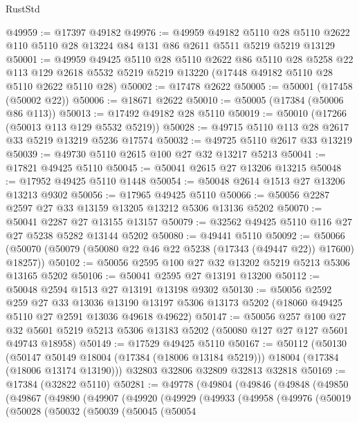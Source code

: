 \begin{lexlean}{RustStd}
\begin{coremodule}
@49959 := @17397 @49182
@49976 := @49959
    @49182
    @5110
    @28
    @5110
    @2622
    @110
    @5110
    @28
    @13224
    @84
    @131
    @86
    @2611
    @5511
    @5219
    @5219
    @13129
@50001 := @49959
    @49425
    @5110
    @28
    @5110
    @2622
    @86
    @5110
    @28
    @5258
    @22
    @113
    @129
    @2618
    @5532
    @5219
    @5219
    @13220
    (@17448 @49182 @5110 @28 @5110 @2622 @5110 @28)
@50002 := @17478 @2622
@50005 := @50001 (@17458 (@50002 @22))
@50006 := @18671 @2622
@50010 := @50005 (@17384 (@50006 @86 @113))
@50013 := @17492 @49182 @28 @5110
@50019 := @50010 (@17266 (@50013 @113 @129 @5532 @5219))
@50028 := @49715 @5110 @113 @28 @2617 @33 @5219 @13219 @5236 @17574
@50032 := @49725 @5110 @2617 @33 @13219
@50039 := @49730 @5110 @2615 @100 @27 @32 @13217 @5213
@50041 := @17821 @49425 @5110
@50045 := @50041 @2615 @27 @13206 @13215
@50048 := @17952 @49425 @5110 @1448
@50054 := @50048 @2614 @1513 @27 @13206 @13213 @9302
@50056 := @17965 @49425 @5110
@50066 := @50056 @2287 @2597 @27 @33 @13159 @13205 @13212 @5306 @13136 @5202
@50070 := @50041 @2287 @27 @13155 @13157
@50079 := @32562 @49425 @5110 @116 @27 @27 @5238 @5282 @13144 @5202
@50080 := @49441 @5110
@50092 := @50066 (@50070 (@50079 (@50080 @22 @46 @22 @5238 (@17343 (@49447 @22)) @17600) @18257))
@50102 := @50056 @2595 @100 @27 @32 @13202 @5219 @5213 @5306 @13165 @5202
@50106 := @50041 @2595 @27 @13191 @13200
@50112 := @50048 @2594 @1513 @27 @13191 @13198 @9302
@50130 := @50056
    @2592
    @259
    @27
    @33
    @13036
    @13190
    @13197
    @5306
    @13173
    @5202
    (@18060 @49425 @5110 @27 @2591 @13036 @49618 @49622)
@50147 := @50056
    @257
    @100
    @27
    @32
    @5601
    @5219
    @5213
    @5306
    @13183
    @5202
    (@50080 @127 @27 @127 @5601 @49743 @18958)
@50149 := @17529 @49425 @5110
@50167 := @50112
    (@50130
      (@50147 @50149 @18004 (@17384 (@18006 @13184 @5219)))
      @18004
      (@17384 (@18006 @13174 @13190)))
    @32803
    @32806
    @32809
    @32813
    @32818
@50169 := @17384 (@32822 @5110)
@50281 := @49778
    (@49804
      (@49846
        (@49848
          (@49850
            (@49867
              (@49890
                (@49907
                  (@49920
                    (@49929
                      (@49933
                        (@49958
                          (@49976
                            (@50019
                              (@50028
                                (@50032
                                  (@50039
                                    (@50045
                                      (@50054

\end{coremodule}
\end{lexlean}
